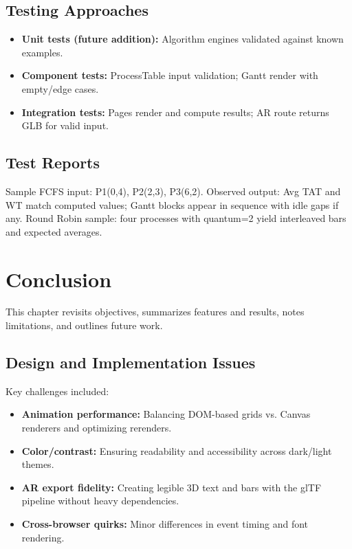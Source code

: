 \documentclass[12pt,a4paper,oneside]{report}
\begin{document}
\section{Testing Approaches}
\begin{itemize}
  \item \textbf{Unit tests (future addition):} Algorithm engines validated against known examples.
  \item \textbf{Component tests:} ProcessTable input validation; Gantt render with empty/edge cases.
  \item \textbf{Integration tests:} Pages render and compute results; AR route returns GLB for valid input.
\end{itemize}

\section{Test Reports}
Sample FCFS input: P1(0,4), P2(2,3), P3(6,2). Observed output: Avg TAT and WT match computed values; Gantt blocks appear in sequence with idle gaps if any. Round Robin sample: four processes with quantum=2 yield interleaved bars and expected averages.

\chapter{Conclusion}
\noindent This chapter revisits objectives, summarizes features and results, notes limitations, and outlines future work.

\section{Design and Implementation Issues}
Key challenges included:
\begin{itemize}
  \item \textbf{Animation performance:} Balancing DOM-based grids vs. Canvas renderers and optimizing rerenders.
  \item \textbf{Color/contrast:} Ensuring readability and accessibility across dark/light themes.
  \item \textbf{AR export fidelity:} Creating legible 3D text and bars with the glTF pipeline without heavy dependencies.
  \item \textbf{Cross-browser quirks:} Minor differences in event timing and font rendering.
\end{itemize}
\end{document}
